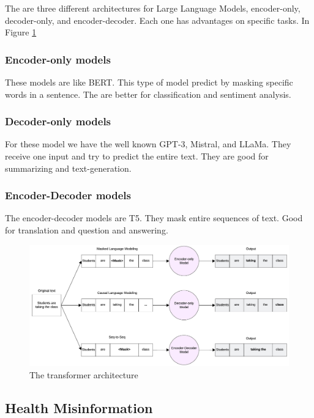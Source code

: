 The are three different architectures for Large Language Models, encoder-only, decoder-only, and encoder-decoder. Each one has advantages on specific tasks. In Figure \ref{architecture}

\subsubsection{Encoder-only models}
These models are like BERT.
This type of model predict by masking specific words in a sentence.
The are better for classification and sentiment analysis.

\subsubsection{Decoder-only models}
For these model we have the well known GPT-3, Mistral, and LLaMa.
They receive one input and try to predict the entire text.
They are good for summarizing and text-generation.

\subsubsection{Encoder-Decoder models}
The encoder-decoder models are T5.
They mask entire sequences of text.
Good for translation and question and answering. \cite{9906925}

\begin{figure}[!htb]
    \centering
        \includegraphics[width=\textwidth]{figures/LLM_Arch_text_generation.png}
        \caption{The transformer architecture}
        \label{architecture}
\end{figure}

\subsection{Health Misinformation}
